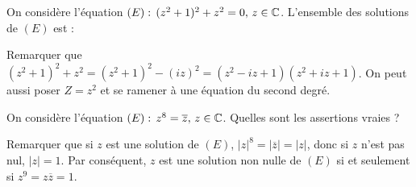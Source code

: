 \begin{question} 

On considère l'équation $(E) :  \, (z^2+1)^2+z^2=0, \, z\in \mathbb{C}$. L'ensemble des solutions de $(E)$ est : 
\begin{answers}
    
    
    
    
      

\end{answers}
\begin{explanations}
Remarquer que $(z^2+1)^2+z^2= (z^2+1)^2 - (iz)^2= (z^2-iz+1)(z^2+iz+1)$. On peut aussi poser $Z=z^2$ et se ramener à une équation du second degré.
\end{explanations}

\end{question}



\begin{question} 

On considère l'équation $(E) : \, z^8= \overline{z}, \, z\in \mathbb{C}$. Quelles sont les assertions vraies ?
\begin{answers}
        
    
    
     

\end{answers}
\begin{explanations}
Remarquer que si $z$ est une solution  de $(E)$, $|z|^8=|\overline{z}|=|z|$, donc si $z$ n'est pas nul,  $|z|=1$.
Par conséquent, $z$ est une solution non nulle de $(E)$ si et seulement si  $z^9=z\overline{z}=1$.
\end{explanations}

\end{question}



